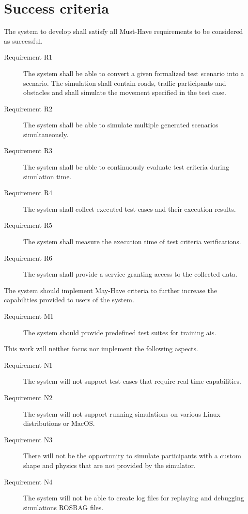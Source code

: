 \section{Success criteria}
The system to develop shall satisfy all Must-Have requirements to be considered as successful.
\begin{description}
    \item[Requirement R1] The system shall be able to convert a given formalized test scenario into a \beamng{} scenario.
        The simulation shall contain roads, traffic participants and obstacles and shall simulate the movement specified in the test case.
    \item[Requirement R2] The system shall be able to simulate multiple generated \beamng{} scenarios simultaneously.
    \item[Requirement R3] The system shall be able to continuously evaluate test criteria during simulation time.
    \item[Requirement R4] The system shall collect executed test cases and their execution results.
    \item[Requirement R5] The system shall measure the execution time of test criteria verifications. 
    \item[Requirement R6] The system shall provide a service granting access to the collected data. 
\end{description}

The system should implement May-Have criteria to further increase the capabilities provided to users of the system.
\begin{description}
    \item[Requirement M1] The system should provide predefined test suites for training \glspl{ai}.
\end{description}

This work will neither focus nor implement the following aspects.
\begin{description}
    \item[Requirement N1] The system will not support test cases that require real time capabilities.
    \item[Requirement N2] The system will not support running simulations on various Linux distributions or MacOS.
    \item[Requirement N3] There will not be the opportunity to simulate participants with a custom shape and physics that are not provided by the simulator.
    \item[Requirement N4] The system will not be able to create log files for replaying and debugging simulations \eg{} ROSBAG files.
\end{description}
